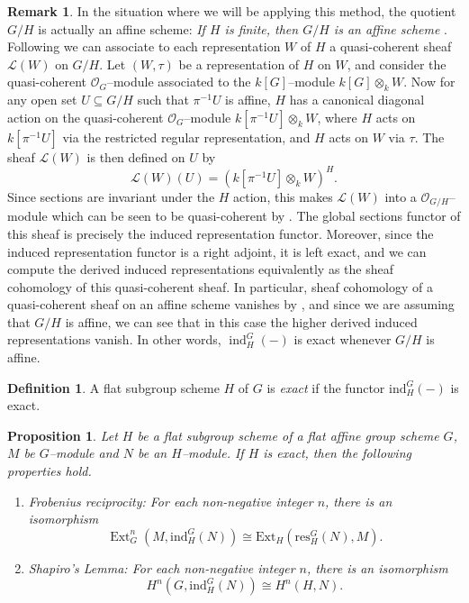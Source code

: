 \documentclass{article}
\theoremstyle{plain}
\newtheorem{Prop}[Th]{Proposition}
\theoremstyle{definition}
\newtheorem{Def}[Th]{Definition}
\newtheorem{Rem}[Th]{Remark}
\DeclareMathOperator{\Ext}{Ext}
\DeclareMathOperator{\ind}{ind}
\begin{document}
\begin{Rem}
    In the situation where we will be applying this method, the quotient $G/H$ is actually an affine scheme: \textit{If $H$ is finite, then $G/H$ is an affine scheme} \cite[page 72 (6)]{jantzen2003representations}. Following \cite[5.8]{jantzen2003representations} we can associate to each representation $W$ of $H$ a quasi-coherent sheaf $\mathcal{L}(W)$ on $G/H$. Let $(W, \tau)$ be a representation of $H$ on $W$, and consider the quasi-coherent $\mathcal{O}_{G}$--module associated to the $k[G]$--module $k[G]\otimes_k W$. Now for any open set $U\subseteq G/H$ such that $\pi^{-1}U$ is affine, $H$ has a canonical diagonal action on the quasi-coherent $\mathcal{O}_G$--module $k[\pi^{-1}U]\otimes_k W$, where $H$ acts on $k[\pi^{-1}U]$ via the restricted regular representation, and $H$ acts on $W$ via $\tau$. The sheaf $\mathcal{L}(W)$ is then defined on $U$ by 
\[
\mathcal{L}(W)(U)=(k[\pi^{-1}U]\otimes_k W)^H.
\]
    Since sections are invariant under the $H$ action, this makes $\mathcal{L}(W)$ into a $\mathcal{O}_{G/H}$--module which can be seen to be quasi-coherent by \cite[5.9]{jantzen2003representations}. The global sections functor of this sheaf is precisely the induced representation functor. Moreover, since the induced representation functor is a right adjoint, it is left exact, and we can compute the derived induced representations equivalently as the sheaf cohomology of this quasi-coherent sheaf. In particular, sheaf cohomology of a quasi-coherent sheaf on an affine scheme vanishes by \cite[III 3.7]{hartshorne2013algebraic}, and since we are assuming that $G/H$ is affine, we can see that in this case the higher derived induced representations vanish. In other words, $\ind^G_H(-)$ is exact whenever $G/H$ is affine.
\end{Rem}


\begin{Def}
    A flat subgroup scheme $H$ of $G$ is \textit{exact} if the functor $\mathrm{ind}_H^G(-)$ is exact. 
\end{Def}



\begin{Prop}\label{frobenius reciprocity}
Let $H$ be a flat subgroup scheme of a flat affine group scheme $G$, $M$ be $G$--module and $N$ be an $H$--module. If $H$ is exact, then the following properties hold.
\begin{enumerate}
    \item \textit{Frobenius reciprocity:} For each non-negative integer $n$, there is an isomorphism 
    \[
    \Ext_G^n(M,\mathrm{ind}_H^G(N))\cong \mathrm{Ext}_H(\mathrm{res}^G_H(N),M).
    \]
    \item \textit{Shapiro's Lemma:} For each non-negative integer $n$, there is an isomorphism 
    \[
    H^n(G,\mathrm{ind}_H^G(N))\cong H^n(H,N).
    \]
\end{enumerate}
\end{Prop}
\end{document}

